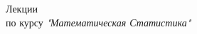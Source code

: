 \begin{titlepage}
\begin{center}

\hspace{0pt}
\vfill
{\LARGE Лекции \\}
{\Large по курсу \textit{"Математическая Статистика"}}
\vfill
\hspace{0pt}

\end{center}
\end{titlepage}
\pagebreak

